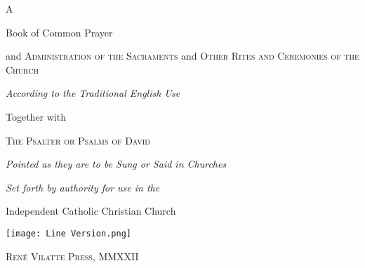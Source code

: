 \thispagestyle{empty}
{\centering
A 

\smallskip

{\sffamily\HUGE Book of Common Prayer}

\medskip

and {\scshape Administration of the Sacraments }
and {\scshape Other Rites and Ceremonies of the Church}

\smallskip

{\itshape According to the Traditional English Use}

\medskip


\medskip

Together with

{\scshape The Psalter or Psalms of David}

{\itshape Pointed as they are to be Sung or Said in Churches}

\medskip
\grealtcross

\medskip

{\itshape Set forth by authority for use in the}

{Independent Catholic Christian Church}


\bigskip
% 
\texttt{[image: Line Version.png]}
\bigskip

{\scshape René Vilatte Press, MMXXII}

}



